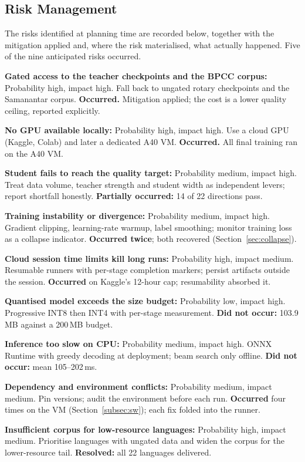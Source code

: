 \subsection{Risk Management}
\label{subsec:risk}

The risks identified at planning time are recorded below, together with the
mitigation applied and, where the risk materialised, what actually happened. Five of the nine anticipated risks occurred.

\begin{bullets}
\item \textbf{Gated access to the teacher checkpoints and the BPCC corpus:} Probability high, impact high. Fall back to ungated rotary checkpoints and the Samanantar corpus. \textbf{Occurred.} Mitigation applied; the cost is a lower quality ceiling, reported explicitly.
\item \textbf{No GPU available locally:} Probability high, impact high. Use a cloud GPU (Kaggle, Colab) and later a dedicated A40 VM. \textbf{Occurred.} All final training ran on the A40 VM.
\item \textbf{Student fails to reach the quality target:} Probability medium, impact high. Treat data volume, teacher strength and student width as independent levers; report shortfall honestly. \textbf{Partially occurred:} 14 of 22 directions pass.
\item \textbf{Training instability or divergence:} Probability medium, impact high. Gradient clipping, learning-rate warmup, label smoothing; monitor training loss as a collapse indicator. \textbf{Occurred twice}; both recovered (Section~\ref{sec:collapse}).
\item \textbf{Cloud session time limits kill long runs:} Probability high, impact medium. Resumable runners with per-stage completion markers; persist artifacts outside the session. \textbf{Occurred} on Kaggle's 12-hour cap; resumability absorbed it.
\item \textbf{Quantised model exceeds the size budget:} Probability low, impact high. Progressive INT8 then INT4 with per-stage measurement. \textbf{Did not occur:} 103.9\,MB against a 200\,MB budget.
\item \textbf{Inference too slow on CPU:} Probability medium, impact high. ONNX Runtime with greedy decoding at deployment; beam search only offline. \textbf{Did not occur:} mean 105--202\,ms.
\item \textbf{Dependency and environment conflicts:} Probability medium, impact medium. Pin versions; audit the environment before each run. \textbf{Occurred} four times on the VM (Section~\ref{subsec:sw}); each fix folded into the runner.
\item \textbf{Insufficient corpus for low-resource languages:} Probability high, impact medium. Prioritise languages with ungated data and widen the corpus for the lower-resource tail. \textbf{Resolved:} all 22 languages delivered.
\end{bullets}

